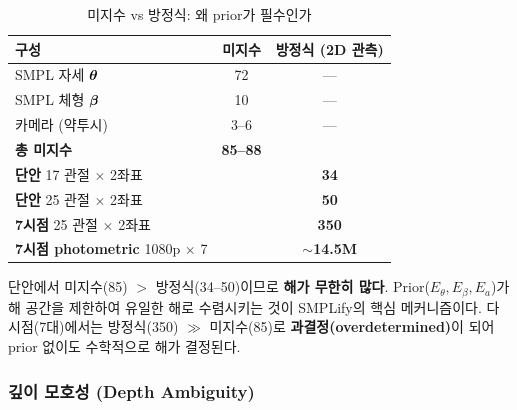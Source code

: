 \documentclass[11pt, a4paper]{report}
\begin{document}
\begin{table}[H]
\centering
\caption{미지수 vs 방정식: 왜 prior가 필수인가}
\renewcommand{\arraystretch}{1.3}
\begin{tabular}{lcc}
\toprule
\textbf{구성} & \textbf{미지수} & \textbf{방정식 (2D 관측)} \\
\midrule
SMPL 자세 $\bm{\theta}$ & 72 & --- \\
SMPL 체형 $\bm{\beta}$ & 10 & --- \\
카메라 (약투시) & 3--6 & --- \\
\midrule
\textbf{총 미지수} & \textbf{85--88} & \\
\midrule
\textbf{단안} 17 관절 $\times$ 2좌표 & & \textbf{34} \\
\textbf{단안} 25 관절 $\times$ 2좌표 & & \textbf{50} \\
\textbf{7시점} 25 관절 $\times$ 2좌표 & & \textbf{350} \\
\textbf{7시점 photometric} 1080p $\times$ 7 & & \textbf{$\sim$14.5M} \\
\bottomrule
\end{tabular}
\end{table}

\begin{keyidea}
단안에서 미지수(85) $>$ 방정식(34--50)이므로 \textbf{해가 무한히 많다}.
Prior($E_\theta, E_\beta, E_a$)가 해 공간을 제한하여 유일한 해로 수렴시키는 것이
SMPLify의 핵심 메커니즘이다.
다시점(7대)에서는 방정식(350) $\gg$ 미지수(85)로 \textbf{과결정(overdetermined)}이 되어
prior 없이도 수학적으로 해가 결정된다.
\end{keyidea}


\subsubsection{깊이 모호성 (Depth Ambiguity)}
\end{document}
